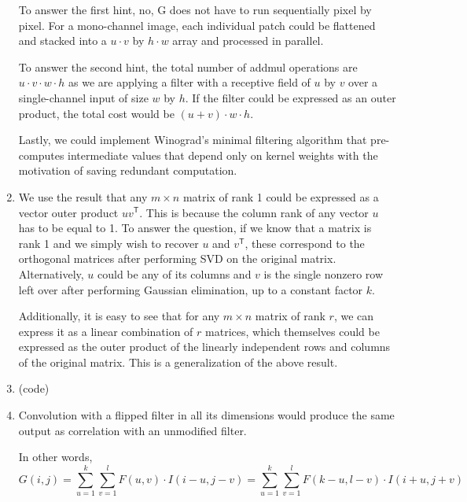 \documentclass{article}
\begin{document}
\begin{enumerate}[label=(\roman*)]
To answer the first hint, no, G does not have to run sequentially pixel by pixel. For a mono-channel image, each individual patch could be flattened and stacked into a $u\cdot v$ by $h\cdot w$ array and processed in parallel.

To answer the second hint, the total number of addmul operations are $u \cdot v \cdot w \cdot h$ as we are applying a filter with a receptive field of $u$ by $v$ over a single-channel input of size $w$ by $h$. If the filter could be expressed as an outer product, the total cost would be $(u+v) \cdot w \cdot h$.

Lastly, we could implement Winograd's minimal filtering algorithm that pre-computes intermediate values that depend only on kernel weights with the motivation of saving redundant computation.


\item %
We use the result that any $m\times n$ matrix of rank 1 could be expressed as a vector outer product $uv^\mathsf{T}$. This is because the column rank of any vector $u$ has to be equal to 1. To answer the question, if we know that a matrix is rank 1 and we simply wish to recover $u$ and $v^\mathsf{T}$, these correspond to the orthogonal matrices after performing SVD on the original matrix. Alternatively, $u$ could be any of its columns and $v$ is the single nonzero row left over after performing Gaussian elimination, up to a constant factor $k$.

Additionally, it is easy to see that for any $m\times n$ matrix of rank $r$, we can express it as a linear combination of $r$ matrices, which themselves could be expressed as the outer product of the linearly independent rows and columns of the original matrix. This is a generalization of the above result.

\item %
(code)

\item %
Convolution with a flipped filter in all its dimensions would produce the same output as correlation with an unmodified filter.

In other words,
\begin{equation}
G(i,j) = \sum_{u=1}^k\sum_{v=1}^l F(u,v)\cdot I(i-u, j-v)
= \sum_{u=1}^k\sum_{v=1}^l F(k-u, l-v) \cdot I(i+u, j+v)
\end{equation}


\end{enumerate}
\end{document}

